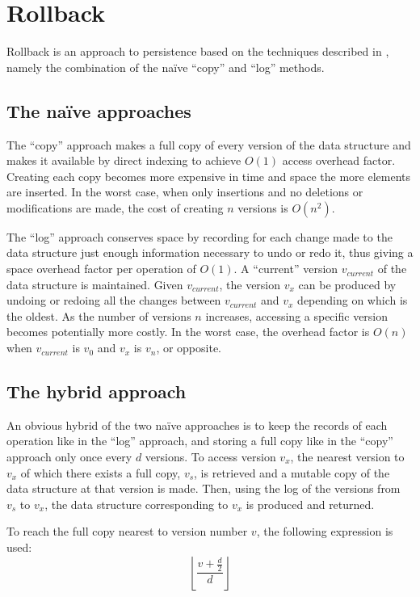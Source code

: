 \section{Rollback}
Rollback is an approach to persistence based on the techniques described in
\cite{Tsotras1995237}, namely the combination of the na\"ive ``copy'' and
``log'' methods.

\subsection{The na\"ive approaches}
The ``copy'' approach makes a full copy of every version of the data structure
and makes it available by direct indexing to achieve $O(1)$ access overhead
factor. Creating each copy becomes more expensive in time and space the more
elements are inserted. In the worst case, when only insertions and no deletions
or modifications are made, the cost of creating $n$ versions is
$O\left(n^2\right)$.

The ``log'' approach conserves space by recording for each change made to the
data structure just enough information necessary to undo or redo it, thus giving
a space overhead factor per operation of $O(1)$. A ``current'' version
$v_{current}$ of the data structure is maintained. Given $v_{current}$, the
version $v_x$ can be produced by undoing or redoing all the changes between
$v_{current}$ and $v_x$ depending on which is the oldest. As the number of
versions $n$ increases, accessing a specific version becomes potentially more
costly. In the worst case, the overhead factor is $O(n)$ when $v_{current}$ is
$v_0$ and $v_x$ is $v_n$, or opposite.

\subsection{The hybrid approach}
An obvious hybrid of the two na\"ive approaches is to keep the records of each
operation like in the ``log'' approach, and storing a full copy like in the
``copy'' approach only once every $d$ versions. To access version $v_x$, the
nearest version to $v_x$ of which there exists a full copy, $v_s$, is retrieved
and a mutable copy of the data structure at that version is made. Then, using
the log of the versions from $v_s$ to $v_x$, the data structure corresponding to
$v_x$ is produced and returned.

To reach the full copy nearest to version number $v$, the following expression
is used:
$$ \left\lfloor \frac{v + \frac{d}{2}}{d} \right\rfloor $$

